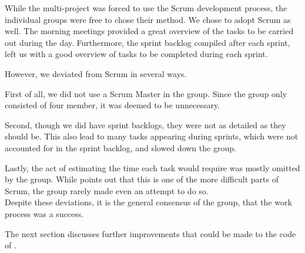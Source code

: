While the multi-project was forced to use the Scrum development process, the individual groups were free to chose their method.
We chose to adopt Scrum as well.
The morning meetings provided a great overview of the tasks to be carried out during the day.
Furthermore, the sprint backlog compiled after each sprint, left us with a good overview of tasks to be completed during each sprint.

However, we deviated from Scrum in several ways.

First of all, we did not use a Scrum Master in the group.
Since the group only consisted of four member, it was deemed to be unnecessary.

Second, though we did have sprint backlogs, they were not as detailed as they should be.
This also lead to many tasks appearing during sprints, which were not accounted for in the sprint backlog, and slowed down the group.

Lastly, the act of estimating the time each task would require was mostly omitted by the group.
While \citet{larmanAgile} points out that this is one of the more difficult parts of Scrum, the group rarely made even an attempt to do so.\\

Despite these deviations, it is the general consensus of the group, that the work process was a success.


The next section discusses further improvements that could be made to the code of \launcher.